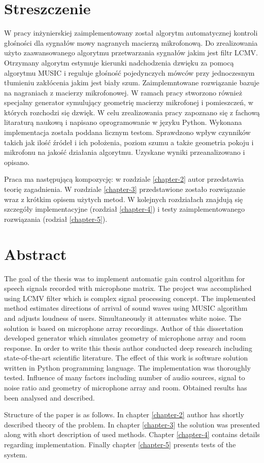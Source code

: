 \chapter*{Streszczenie}


W pracy inżynierskiej zaimplementowany został algorytm automatycznej kontroli głośności dla sygnałów mowy nagranych macierzą mikrofonową. Do zrealizowania użyto zaawansowanego algorytmu przetwarzania sygnałów jakim jest filtr LCMV. Otrzymany algorytm estymuje kierunki nadchodzenia dzwięku za pomocą algorytmu MUSIC i reguluje głośność pojedynczych mówców przy jednoczesnym tłumieniu zakłócenia jakim jest biały szum. Zaimplemntowane rozwiązanie bazuje na nagraniach z macierzy mikrofonowej. W ramach pracy stworzono również specjalny generator symulujący geometrię macierzy mikrofonej i pomieszczeń, w których rozchodzi się dzwięk. W celu zrealizowania pracy zapoznano się z fachową litaraturą naukową i napisano oprogramowanie w języku Python. Wykonana implementacja została poddana licznym testom. Sprawdzono wpływ czynników takich jak ilość źródeł i ich położenia, poziom szumu a także geometria pokoju i mikrofonu na jakość działania algorytmu. Uzyskane wyniki przeanalizowano i opisano. 

Praca ma następującą kompozycję: w rozdziale \ref{chapter-2} autor przedstawia teorię zagadnienia. W rozdziale \ref{chapter-3} przedstawione zostało rozwiązanie wraz z krótkim opisem użytych metod. W kolejnych rozdziałach znajdują się szczegóły implementacyjne (rozdział \ref{chapter-4}) i testy zaimplementowanego rozwiązania (rodział \ref{chapter-5}).

\newpage

\chapter*{Abstract}

The goal of the thesis was to implement automatic gain control algorithm for speech signals recorded with microphone matrix. The project was accomplished using LCMV filter which is complex signal processing concept. The implemented method estimates directions of arrival of sound waves using MUSIC algorithm and adjusts loudness of users. Simultaneously it attenuates white noise. The solution is based on microphone array recordings. Author of this dissertation developed generator which simulates geometry of microphone array and room response. In order to write this thesis author conducted deep research including state-of-the-art scientific literature. The effect of this work is software solution written in Python programming language. The implementation was thoroughly tested. Influence of many factors including number of audio sources, signal to noise ratio and geometry of microphone array and room. Obtained results has been analysed and described. 

Structure of the paper is as follows. In chapter \ref{chapter-2} author has shortly described theory of the problem. In chapter \ref{chapter-3} the solution was presented along with short description of used methods. Chapter \ref{chapter-4} contains details regarding implementation. Finally chapter \ref{chapter-5} presents tests of the system.